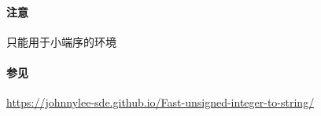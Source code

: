 \paragraph{注意}

只能用于小端序的环境

\paragraph{参见}

\url{https://johnnylee-sde.github.io/Fast-unsigned-integer-to-string/}
